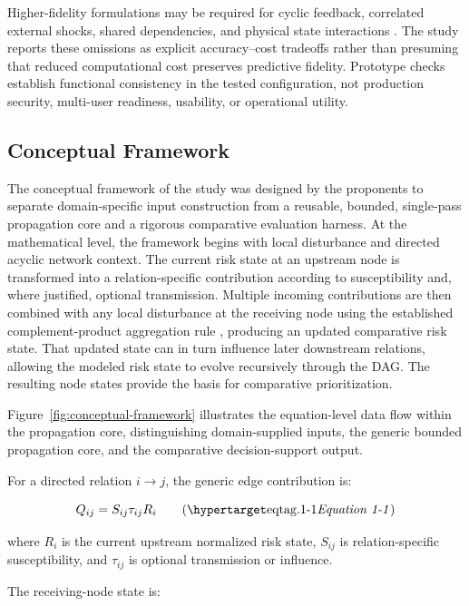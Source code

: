Higher-fidelity formulations may be required for cyclic feedback, correlated
external shocks, shared dependencies, and physical state interactions
\citep{buldyrev2010,shuang2017,petrone2018,wu2026,dastgir2024,zhang2024}.
The study reports these omissions as explicit accuracy--cost tradeoffs rather
than presuming that reduced computational cost preserves predictive fidelity.
Prototype checks establish functional consistency in the tested
configuration, not production security, multi-user readiness, usability, or
operational utility.

\subsection{Conceptual Framework}\label{conceptual-framework}

The conceptual framework of the study was designed by the proponents to
separate domain-specific input construction from a reusable, bounded,
single-pass propagation core and a rigorous comparative evaluation harness.
At the mathematical level, the framework begins with local disturbance and
directed acyclic network context. The current risk state at an upstream node
is transformed into a relation-specific contribution according to
susceptibility and, where justified, optional transmission. Multiple incoming
contributions are then combined with any local disturbance at the receiving
node using the established complement-product aggregation rule
\citep{klement2004}, producing an updated comparative risk state. That
updated state can in turn influence later downstream relations, allowing the
modeled risk state to evolve recursively through the DAG. The resulting node
states provide the basis for comparative prioritization.

Figure~\ref{fig:conceptual-framework} illustrates the equation-level data
flow within the propagation core, distinguishing domain-supplied inputs, the
generic bounded propagation core, and the comparative decision-support output.



For a directed relation $i\to j$, the generic edge contribution is:

\[Q_{ij}=S_{ij}\tau_{ij}R_i\eqtag{1-1}\]

where $R_i$ is the current upstream normalized risk state, $S_{ij}$ is
relation-specific susceptibility, and $\tau_{ij}$ is optional transmission or
influence.

The receiving-node state is:

